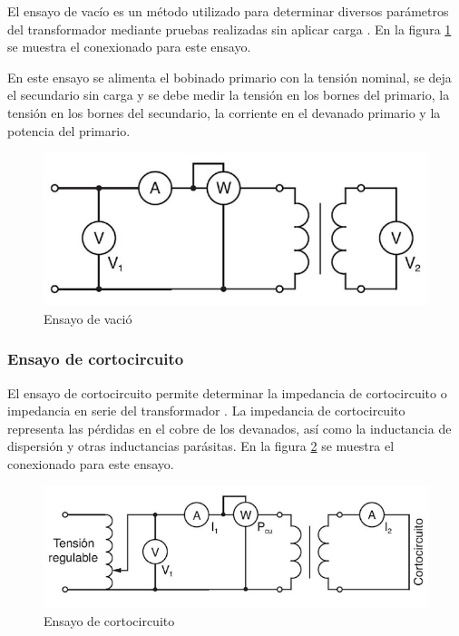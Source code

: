 El ensayo de vacío es un método utilizado para determinar diversos parámetros del transformador mediante pruebas realizadas sin aplicar carga \citep{TRAFO_VACIO}. En la figura \ref{fig:figEnsayoVacio} se muestra el conexionado para este ensayo.

En este ensayo se alimenta el bobinado primario con la tensión nominal, se deja el secundario sin carga y se debe medir la tensión en los bornes del primario, la tensión en los bornes del secundario, la corriente en el devanado primario y la potencia del primario. 

\begin{figure}[htpb]
	\centering
	\includegraphics[scale=.4]{./Figures/EnsayoVacio.png}
	\caption{Ensayo de vació}
	\label{fig:figEnsayoVacio}
\end{figure}

\subsubsection{Ensayo de cortocircuito}
El ensayo de cortocircuito permite determinar la impedancia de cortocircuito o impedancia en serie del transformador \citep{TRAFO_CORTO}. La impedancia de cortocircuito representa las pérdidas en el cobre de los devanados, así como la inductancia de dispersión y otras inductancias parásitas. En la figura \ref{fig:figEnsayoCorto} se muestra el conexionado para este ensayo.

\begin{figure}[htpb]
	\centering
	\includegraphics[scale=.5]{./Figures/EnsayoCorto.png}
	\caption{Ensayo de cortocircuito}
	\label{fig:figEnsayoCorto}
\end{figure}

